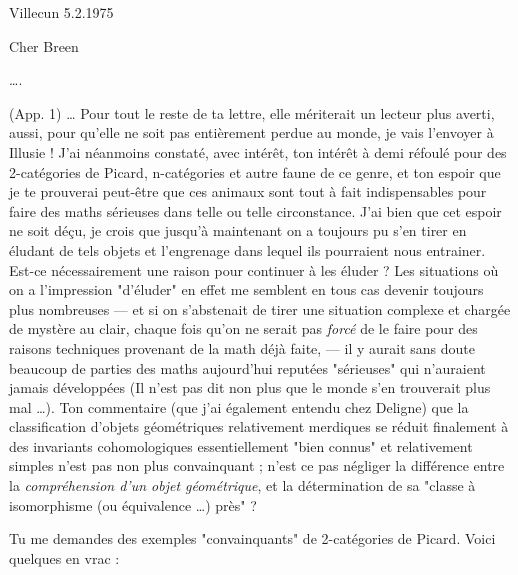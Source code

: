 \documentclass[11pt,a4paper]{article}
\begin{document}
Villecun 5.2.1975

Cher Breen

….

(App. 1) … Pour tout le reste de ta lettre, elle mériterait un lecteur plus
averti, aussi, pour qu'elle ne soit pas entièrement perdue au monde, je vais
l'envoyer à Illusie ! J'ai néanmoins constaté, avec intérêt, ton intérêt à demi
réfoulé pour des 2-catégories de Picard, n-catégories et autre faune de ce
genre, et ton espoir que je te prouverai peut-être que ces animaux sont tout à
fait indispensables pour faire des maths sérieuses dans telle ou telle
circonstance. J'ai bien  que cet espoir ne soit déçu, je crois que
jusqu'à maintenant on a toujours pu s'en tirer en éludant de tels objets et
l'engrenage dans lequel ils pourraient nous entrainer. Est-ce nécessairement une
raison pour continuer à les éluder ? Les situations où on a l'impression
"d'éluder" en effet me semblent en tous cas devenir toujours plus nombreuses —
et si on s'abstenait de tirer une situation complexe et chargée de mystère au
clair, chaque fois qu'on ne serait pas \emph{forcé} de le faire pour des raisons
techniques provenant de la math déjà faite, — il y aurait sans doute beaucoup de
parties des maths aujourd'hui reputées "sérieuses" qui n'auraient jamais
 développées (Il n'est pas dit non plus que le monde s'en trouverait
plus mal …). Ton commentaire (que j'ai également entendu chez Deligne) que la
classification d'objets géométriques relativement merdiques se réduit finalement
à des invariants cohomologiques essentiellement "bien connus" et relativement
simples n'est pas non plus convainquant ; n'est ce pas négliger la différence
entre la \emph{compréhension d'un objet géométrique}, et la détermination de sa
"classe à isomorphisme (ou équivalence …) près" ?


Tu me demandes des exemples "convainquants" de 2-catégories de Picard. Voici
quelques   en vrac  :
\end{document}
